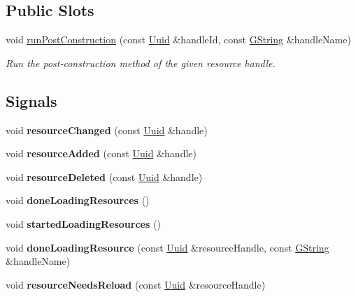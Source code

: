 \subsection*{Public Slots}
\begin{DoxyCompactItemize}
\item 
\mbox{\label{classrev_1_1_resource_cache_aa5f04dcdc5fa34036f639671ba4ca4af}} 
void \mbox{\hyperlink{classrev_1_1_resource_cache_aa5f04dcdc5fa34036f639671ba4ca4af}{run\+Post\+Construction}} (const \mbox{\hyperlink{classrev_1_1_uuid}{Uuid}} \&handle\+Id, const \mbox{\hyperlink{classrev_1_1_g_string}{G\+String}} \&handle\+Name)
\begin{DoxyCompactList}\small\item\em Run the post-\/construction method of the given resource handle. \end{DoxyCompactList}\end{DoxyCompactItemize}
\subsection*{Signals}
\begin{DoxyCompactItemize}
\item 
\mbox{\label{classrev_1_1_resource_cache_a41227d1d18312fca28722a546eea778e}} 
void {\bfseries resource\+Changed} (const \mbox{\hyperlink{classrev_1_1_uuid}{Uuid}} \&handle)
\item 
\mbox{\label{classrev_1_1_resource_cache_ab4231c5ec96d7971de9f2d0b401ca360}} 
void {\bfseries resource\+Added} (const \mbox{\hyperlink{classrev_1_1_uuid}{Uuid}} \&handle)
\item 
\mbox{\label{classrev_1_1_resource_cache_a9b8f589a98a246d27cfe61c0099208c7}} 
void {\bfseries resource\+Deleted} (const \mbox{\hyperlink{classrev_1_1_uuid}{Uuid}} \&handle)
\item 
\mbox{\label{classrev_1_1_resource_cache_a4e461fa311935681d520cbad94a2b35e}} 
void {\bfseries done\+Loading\+Resources} ()
\item 
\mbox{\label{classrev_1_1_resource_cache_af523582dd1171a7709c32152e55fe806}} 
void {\bfseries started\+Loading\+Resources} ()
\item 
\mbox{\label{classrev_1_1_resource_cache_a2f9009078e9ac52f9ec33545523d0fd8}} 
void {\bfseries done\+Loading\+Resource} (const \mbox{\hyperlink{classrev_1_1_uuid}{Uuid}} \&resource\+Handle, const \mbox{\hyperlink{classrev_1_1_g_string}{G\+String}} \&handle\+Name)
\item 
\mbox{\label{classrev_1_1_resource_cache_a0fe870b4a3e0b148df0a35da180ed402}} 
void {\bfseries resource\+Needs\+Reload} (const \mbox{\hyperlink{classrev_1_1_uuid}{Uuid}} \&resource\+Handle)
\end{DoxyCompactItemize}
